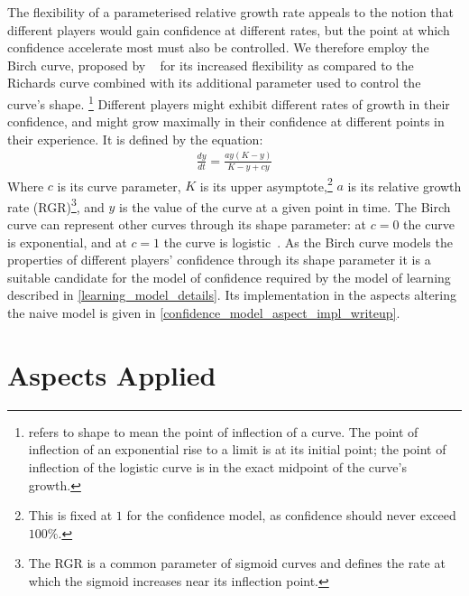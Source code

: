 The flexibility of a parameterised relative growth rate appeals to the notion
that different players would gain confidence at different rates, but the point
at which confidence accelerate most must also be controlled. We therefore employ
the Birch curve, proposed by \citeauthor{birch1999new}~\cite{birch1999new} for
its increased flexibility as compared to the Richards curve combined with its
additional parameter used to control the curve's shape.
\footnote{\citet{birch1999new} refers to shape to mean the point of
inflection of a curve. The point of inflection of an exponential rise to a limit
is at its initial point; the point of inflection of the logistic curve is in the
exact midpoint of the curve's growth.} Different players might exhibit different
rates of growth in their confidence, and might grow maximally in their
confidence at different points in their experience. It is defined by the
equation:
\begin{align*}
\frac{dy}{dt} = \frac{ay(K-y)}{K-y+cy}
\end{align*}
Where $c$ is its curve parameter, $K$ is its upper asymptote,\footnote{This is
fixed at $1$ for the confidence model, as confidence should never exceed
$100\%$.} $a$ is its relative growth rate (RGR)\footnote{The RGR is a common
parameter of sigmoid curves and defines the rate at which the sigmoid increases
near its inflection point.}, and $y$ is the value of the curve at a given point
in time. The Birch curve can represent other curves through its shape parameter:
at $c=0$ the curve is exponential, and at $c=1$ the curve is
logistic~\cite{birch1999new}. As the Birch curve models the properties of
different players' confidence through its shape parameter it is a suitable
candidate for the model of confidence required by the model of learning
described in \cref{learning_model_details}. Its implementation in the aspects
altering the naive model is given in
\cref{confidence_model_aspect_impl_writeup}.


\section{Aspects Applied}
\label{sec:optimisation_with_aspects_aspectsdeveloped}
\label{aspects_applied_section}




